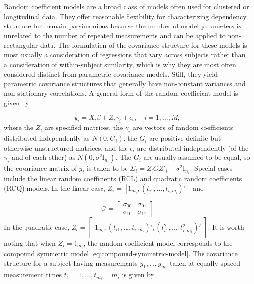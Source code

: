 \bigskip

Random coefficient models are a broad class of models often used for clustered or longitudinal data. They offer reasonable flexibility for characterizing dependency structure but remain parsimonious because the number of model parameters is unrelated to the number of repeated measurements and can be applied to non-rectangular data.  The formulation of the covariance structure for these models is most usually a consideration of regressions that vary across subjects rather than a consideration of within-subject similarity, which is why they are most often considered distinct from parametric covariance models. Still, they yield parametric covariance structures that generally have non-constant variances and non-stationary correlations.  A general form of the random coefficient model is given by 

\begin{equation}
y_i = X_i\beta + Z_i \gamma_i + \epsilon_i, \quad i = 1, \dots, M,
\end{equation}
\noindent
where the $Z_i$ are specified matrices, the $\gamma_i$ are vectors of random coefficients distributed independently as $N \left(0, G_i\right)$, the $G_i$ are positive definite but otherwise unstructured matrices, and the $\epsilon_i$ are distributed independently (of the $\gamma_i$ and of each other) as $N \left(0, \sigma^2 \mathrm{I}_{n_i}\right)$. The $G_i$ are usually assumed to be equal, so the covariance matrix of $y_i$ is taken to be $\Sigma_i = Z_i GZ'_i + \sigma^2 \mathrm{I}_{n_i}$. Special cases include the linear random coefficients (RCL) and quadratic random coefficients (RCQ) models. In the linear case, $Z_i = \left[1_{m_i} , \left(t_{i1},\dots,t_{i, m_i}\right)'\right]$ and 

\begin{equation*}
G = \begin{bmatrix}
\sigma_{00} & \sigma_{01} \\
\sigma_{10} & \sigma_{11} 
\end{bmatrix}
\end{equation*}
\noindent
In the quadratic case, $Z_i =\begin{bmatrix}1_{m_i}, \left(t_{i1}, \dots, t_{i,m_i}\right)', \left(t^2_{i1}, \dots, t^2_{i,m_i}\right)'\end{bmatrix}$. It is worth noting that when $Z_i = 1_{m_i}$, the random coefficient model corresponds to the compound symmetric model \ref{eq:compound-symmetric-model}. The covariance structure for a subject having measurements $y_1,\dots, y_{m_i}$ taken at equally spaced measurement times $t_1 = 1, \dots,t_{m_i} = m_i$ is given by  


